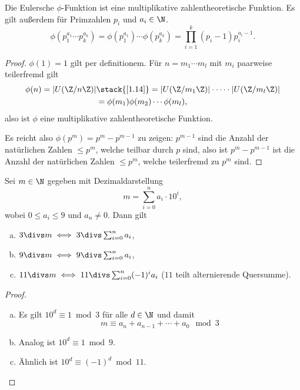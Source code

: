 \begin{kor} \label{1.15}
	Die Eulersche $\phi$-Funktion ist eine multiplikative zahlentheoretische Funktion.
	Es gilt außerdem für Primzahlen $p_i$ und $a_i \in \N$.
	\[
		\phi( p_1^{a_1} \dotsb p_k^{a_k} )
		=\phi( p_1^{a_1}) \dotsb \phi(p_k^{a_k})
		= \prod_{i=1}^k (p_i - 1) p_i^{a_i - 1}.
	\]
	\begin{proof}
		$\phi(1) = 1$ gilt per definitionem.
		Für $n = m_1 \dotsb m_l$ mit $m_i$ paarweise teilerfremd gilt
		\begin{align*}
			\phi(n)
			= | U(\Z / n\Z) |
			&\stack{\ref{1.14}}= |U(\Z /m _1 \Z) | \cdot \dotsb \cdot | U(\Z /m_l \Z) | \\
			&= \phi(m_1)\phi(m_2) \dotsb \phi(m_l),
		\end{align*}
		also ist $\phi$ eine multiplikative zahlentheoretische Funktion.

		Es reicht also $\phi(p^m) = p^m - p^{m-1}$ zu zeigen:
		$p^{m-1}$ sind die Anzahl der natürlichen Zahlen $\le p^m$, welche teilbar durch $p$ sind,
		also ist $p^m - p^{m-1}$ ist die Anzahl der natürlichen Zahlen $\le p^m$, welche teilerfremd zu $p^m$ sind.
	\end{proof}
\end{kor}

\begin{st}[Teilbarkeitskriterien] \label{1.16}
	Sei $m \in \N$ gegeben mit Dezimaldarstellung
	\[
		m = \sum_{i=0}^n a_i \cdot 10^i,
	\]
	wobei $0 \le a_i \le 9$ und $a_n \neq 0$.
	Dann gilt
	\begin{enumerate}[a)]
		\item
			$3 \divs m \iff 3 \divs \sum_{i=0}^n a_i$,
		\item
			$9 \divs m \iff 9 \divs \sum_{i=0}^n a_i$,
		\item
			$11 \divs m \iff 11 \divs \sum_{i=0}^n (-1)^i a_i$ ($11$ teilt alternierende Quersumme).
	\end{enumerate}
	\begin{proof}
		\begin{enumerate}[a)]
			\item
				Es gilt $10^d \equiv 1 \bmod 3$ für alle $d \in \N$ und damit
				\[
					m \equiv a_n + a_{n-1} + \dotsb + a_0 \mod 3
				\]
			\item
				Analog ist $10^d \equiv 1 \bmod 9$.
			\item
				Ähnlich ist $10^d \equiv (-1)^d \bmod 11$.
		\end{enumerate}
	\end{proof}
\end{st}
